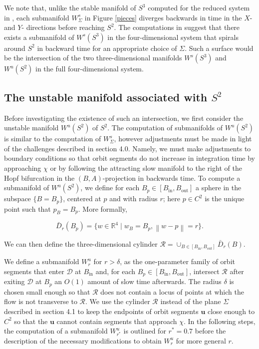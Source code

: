 \documentclass{ws-ijbc}
\begin{document}
We note that, unlike the stable manifold of $S^3$ computed for the reduced system in \cite{QSSA}, each submanifold $W^{s}_{\Sigma}$ in Figure \ref{pieces} diverges backwards in time in the $X$- and $Y$- directions before reaching $S^2$.  The computations in \cite{QSSA} suggest that there exists a  submanifold of $W^s(S^3)$ in the four-dimensional system that spirals around $S^2$ in backward time for an appropriate choice of $\Sigma$.  Such a surface would be the intersection of the two three-dimensional manifolds $W^s(S^3)$ and $W^u(S^2)$ in the full four-dimensional system.  

\subsection{The unstable manifold associated with $S^2$}

Before investigating the existence of such an intersection, we first consider the unstable manifold $W^{u}(S^2)$ of $S^2$.  The computation of submanifolds of $W^{u}(S^2)$ is similar to the computation of $W^{s}_\Sigma$, however adjustments must be made in light of the challenges described in section 4.0.  Namely, we must make adjustments to boundary conditions so that orbit segments do not increase in integration time by approaching $\chi$ or by following the attracting slow manifold to the right of the Hopf bifurcation in the $(B,A)$-projection in backwards time.  To compute a submanifold of $W^u(S^2)$, we define for each $B_p \in [B_{\mathrm{in}}, B_{\mathrm{out}}]$ a sphere in the subspace $\{B=B_p\}$, centered at $p$ and with radius $r$; here $p \in C^2$ is the unique point such that $p_B = B_p$.  More formally,

\begin{equation*}
\bar{D}_r(B_p)=\{w \in \mathbb{R}^4 \;|\; w_B = B_p, \left\lVert w-p \right\lVert  = r\}.
\end{equation*}

\noindent
We can then define the three-dimensional cylinder $\mathscr{R} = \cup_{B \in [B_{\mathrm{in}}, B_{\mathrm{out}}]}\bar{D}_r(B)$.  

We define a submanifold $W^u_r$ for $r>\delta$, as the one-parameter family of orbit segments that enter $\mathscr{D}$ at $B_{\mathrm{in}}$ and, for each $B_p \in [B_{\mathrm{in}}, B_{\mathrm{out}}]$, intersect $\mathscr{R}$ after exiting $\mathscr{D}$ at $B_p$ an $O(1)$ amount of slow time afterwards.  The radius $\delta$ is chosen small enough so that $\mathscr{R}$ does not contain a locus of points at which the flow is not transverse to $\mathscr{R}$.  We use the cylinder $\mathscr{R}$ instead of the plane $\Sigma$ described in section 4.1 to keep the endpoints of orbit segments $\mathbf{u}$ close enough to $C^2$ so that the $\mathbf{u}$ cannot contain segments that approach $\chi$.  In the following steps, the computation of a submanifold $W^u_{r^*}$ is outlined for $r^*=0.7$ before the description of the necessary modifications to obtain $W^u_r$ for more general $r$. 
\end{document}
